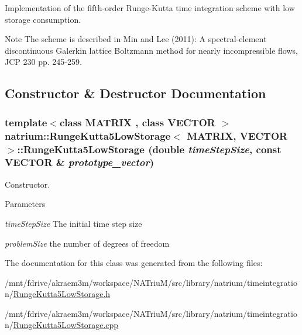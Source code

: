 Implementation of the fifth-\/order Runge-\/Kutta time integration scheme with low storage consumption. \begin{DoxyNote}{Note}
The scheme is described in Min and Lee (2011): A spectral-\/element discontinuous Galerkin lattice Boltzmann method for nearly incompressible flows, JCP 230 pp. 245-\/259. 
\end{DoxyNote}


\subsection{Constructor \& Destructor Documentation}
\hypertarget{classnatrium_1_1RungeKutta5LowStorage_a1f879ee900db9ac82ddd12820e7b703d}{
\subsubsection[{RungeKutta5LowStorage}]{\setlength{\rightskip}{0pt plus 5cm}template$<$class MATRIX , class VECTOR $>$ {\bf natrium::RungeKutta5LowStorage}$<$ MATRIX, VECTOR $>$::{\bf RungeKutta5LowStorage} (double {\em timeStepSize}, \/  const VECTOR \& {\em prototype\_\-vector})}}
\label{classnatrium_1_1RungeKutta5LowStorage_a1f879ee900db9ac82ddd12820e7b703d}


Constructor. 
\begin{DoxyParams}{Parameters}
\item[{\em timeStepSize}]The initial time step size \item[{\em problemSize}]the number of degrees of freedom \end{DoxyParams}


The documentation for this class was generated from the following files:\begin{DoxyCompactItemize}
\item 
/mnt/fdrive/akraem3m/workspace/NATriuM/src/library/natrium/timeintegration/\hyperlink{RungeKutta5LowStorage_8h}{RungeKutta5LowStorage.h}\item 
/mnt/fdrive/akraem3m/workspace/NATriuM/src/library/natrium/timeintegration/\hyperlink{RungeKutta5LowStorage_8cpp}{RungeKutta5LowStorage.cpp}\end{DoxyCompactItemize}
